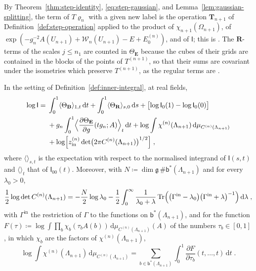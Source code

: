 \documentclass[11pt]{preprint}
\makeatletter
\newcommand{\dd}{\mathrm{d}}
\newcommand*{\bigcdot}{}%
\DeclareRobustCommand*{\bigcdot}{%
	\mathbin{\mathpalette\bigcdot@{}}%
}
\newcommand*{\bigcdot@scalefactor}{.7}
\newcommand*{\bigcdot@widthfactor}{1.15}
\newcommand*{\bigcdot@}[2]{%
	\sbox0{$#1\vcenter{}$}%
	\sbox2{$#1\cdot\m@th$}%
	\hbox to \bigcdot@widthfactor\wd2{%
		\hss
		\raise\ht0\hbox{%
			\scalebox{\bigcdot@scalefactor}{%
				\lower\ht0\hbox{$#1\bullet\m@th$}%
			}%
		}%
		\hss
	}%
}
\numberwithin{equation}{section}
\makeatother
\begin{document}
By Theorem~\ref{thm:step-identity}, \eqref{eq:step-gaussian}, and Lemma~\ref{lem:gaussian-splitting}, the term of $T\varrho_n$ with a given new label is the operation $\mathbf T_{n+1}$ of Definition~\ref{def:step-operation} applied to the product of $\chi_{n+1}(\Omega_{n+1})$, of $\exp(-g_n^{-2}A(U_{n+1}) + \mathcal W_n(U_{n+1}) - E + E^{(n)}_0)$, and of $\mathsf I$; this is \cite[(3.25)]{BalabanCRE}. The $\mathbf R$-terms of the scales $j \leqslant n_1$ are counted in $\Theta_{\mathbf E}$ because the cubes of their grids are contained in the blocks of the points of $T^{(n+1)}$, so that their sums are covariant under the isometries which preserve $T^{(n+1)}$, as the regular terms are \cite[pp.~270--271]{BalabanCRE}.

\begin{proposition}\label{prop:step-interpolations}
In the setting of Definition~\ref{def:inner-integral}, at real fields,
\begin{equation}\label{eq:step-interpolations}
\begin{aligned}
    \log\mathsf I ={}& \int_0^1\langle\Theta_{\mathbf B}\rangle_{1,t}\,\dd t + \int_0^1\langle\Theta_{\mathbf R}\rangle_{s,0}\,\dd s + \bigl[\log\mathsf I_0(1) - \log\mathsf I_0(0)\bigr]\\
    &+ g_n\int_0^1\Bigl\langle\frac{\partial\Theta_{\mathbf E}}{\partial g}(tg_n; A)\Bigr\rangle_t\,\dd t + \log\int\chi^{(n)}(\Lambda_{n+1})\,\dd\mu_{C^{(n)}(\Lambda_{n+1})}\\
    &+ \log\Bigl[z^{(n)}_{\mathrm{in}}\det\bigl(2\pi C^{(n)}(\Lambda_{n+1})\bigr)^{1/2}\Bigr]\;,
\end{aligned}
\end{equation}
where $\langle\bigcdot\rangle_{s,t}$ is the expectation with respect to the normalised integrand of $\mathsf I(s, t)$ and $\langle\bigcdot\rangle_t$ that of $\mathsf I_{00}(t)$. Moreover, with $N \coloneqq \dim\mathfrak g\,\#\mathsf b^*(\Lambda_{n+1})$ and for every $\lambda_0 > 0$,
\begin{equation}\label{eq:determinant-resolvent}
    \frac{1}{2}\log\det C^{(n)}(\Lambda_{n+1}) = -\frac{N}{2}\log\lambda_0 - \frac{1}{2}\int_0^\infty\frac{1}{\lambda_0 + \lambda}\operatorname{Tr}\Bigl(\bigl(\Gamma^{\mathrm{in}} - \lambda_0\bigr)\bigl(\Gamma^{\mathrm{in}} + \lambda\bigr)^{-1}\Bigr)\,\dd\lambda\;,
\end{equation}
with $\Gamma^{\mathrm{in}}$ the restriction of $\Gamma$ to the functions on $\mathsf b^*(\Lambda_{n+1})$, and for the function $F(\tau) \coloneqq \log\int\prod_b\chi_b(\tau_bA(b))\,\dd\mu_{C^{(n)}(\Lambda_{n+1})}(A)$ of the numbers $\tau_b \in [0, 1]$, in which $\chi_b$ are the factors of $\chi^{(n)}(\Lambda_{n+1})$,
\begin{equation}\label{eq:characteristic-interpolation}
    \log\int\chi^{(n)}(\Lambda_{n+1})\,\dd\mu_{C^{(n)}(\Lambda_{n+1})} = \sum_{b \in \mathsf b^*(\Lambda_{n+1})}\int_0^1\frac{\partial F}{\partial\tau_b}(t, \dots, t)\,\dd t\;.
\end{equation}
\end{proposition}
\end{document}
